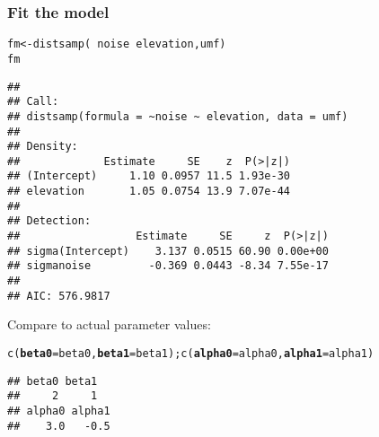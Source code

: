 \documentclass[color=usenames,dvipsnames]{beamer}\usepackage[]{graphicx}\usepackage[]{color}
\makeatletter
\newcommand{\hlopt}[1]{\textcolor[rgb]{0,0,0}{#1}}%
\newcommand{\hlstd}[1]{\textcolor[rgb]{0,0,0}{#1}}%
\newcommand{\hlkwb}[1]{\textcolor[rgb]{0,0.341,0.682}{#1}}%
\newcommand{\hlkwc}[1]{\textcolor[rgb]{0,0,0}{\textbf{#1}}}%
\newcommand{\hlkwd}[1]{\textcolor[rgb]{0.004,0.004,0.506}{#1}}%
\newenvironment{kframe}{%
 \def\at@end@of@kframe{}%
 \ifinner\ifhmode%
  \def\at@end@of@kframe{\end{minipage}}%
  \begin{minipage}{\columnwidth}%
 \fi\fi%
 \def\FrameCommand##1{\hskip\@totalleftmargin \hskip-\fboxsep
 \colorbox{shadecolor}{##1}\hskip-\fboxsep
     \hskip-\linewidth \hskip-\@totalleftmargin \hskip\columnwidth}%
 \MakeFramed {\advance\hsize-\width
   \@totalleftmargin\z@ \linewidth\hsize
   \@setminipage}}%
 {\par\unskip\endMakeFramed%
 \at@end@of@kframe}
\newenvironment{knitrout}{}{} %
\makeatother
\begin{document}
\begin{frame}[fragile]
  \frametitle{Fit the model}
  \footnotesize
\begin{knitrout}\tiny
{}\color{fgcolor}\begin{kframe}
\begin{alltt}
\hlstd{fm} \hlkwb{<-} \hlkwd{distsamp}\hlstd{(}\hlopt{~}\hlstd{noise} \hlopt{~}\hlstd{elevation, umf)}
\hlstd{fm}
\end{alltt}
\begin{verbatim}
## 
## Call:
## distsamp(formula = ~noise ~ elevation, data = umf)
## 
## Density:
##             Estimate     SE    z  P(>|z|)
## (Intercept)     1.10 0.0957 11.5 1.93e-30
## elevation       1.05 0.0754 13.9 7.07e-44
## 
## Detection:
##                  Estimate     SE     z  P(>|z|)
## sigma(Intercept)    3.137 0.0515 60.90 0.00e+00
## sigmanoise         -0.369 0.0443 -8.34 7.55e-17
## 
## AIC: 576.9817
\end{verbatim}
\end{kframe}
\end{knitrout}
\pause
\vfill
Compare to actual parameter values:
\vspace{-6pt}
\begin{knitrout}\tiny
{}\color{fgcolor}\begin{kframe}
\begin{alltt}
\hlkwd{c}\hlstd{(}\hlkwc{beta0}\hlstd{=beta0,} \hlkwc{beta1}\hlstd{=beta1);} \hlkwd{c}\hlstd{(}\hlkwc{alpha0}\hlstd{=alpha0,} \hlkwc{alpha1}\hlstd{=alpha1)}
\end{alltt}
\begin{verbatim}
## beta0 beta1 
##     2     1
## alpha0 alpha1 
##    3.0   -0.5
\end{verbatim}
\end{kframe}
\end{knitrout}
\end{frame}
\end{document}
